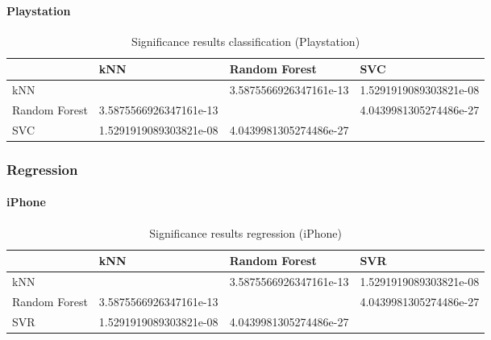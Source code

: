 \paragraph{Playstation}
\begin{table}[h]
	\begin{center}
	\begin{tabular}{| p{3.25cm} || p{3.25cm} | p{3.25cm} | p{3.25cm} |}
		\hline
		& kNN & Random Forest & SVC \\
		\hline \hline
		kNN & & 3.5875566926347161e-13 & 1.5291919089303821e-08 \\
		\hline
		Random Forest & 3.5875566926347161e-13 & & 4.0439981305274486e-27 \\
		\hline
		SVC & 1.5291919089303821e-08 & 4.0439981305274486e-27 & \\
		\hline
	\end{tabular}
	\end{center}
	\caption{Significance results classification (Playstation)}
	\label{tab_commission}
\end{table}
\subsubsection{Regression}
\paragraph{iPhone}
\begin{table}[h]
	\begin{center}
	\begin{tabular}{| p{3.25cm} || p{3.25cm} | p{3.25cm} | p{3.25cm} |}
		\hline
		& kNN & Random Forest & SVR \\
		\hline \hline
		kNN & & 3.5875566926347161e-13 & 1.5291919089303821e-08 \\
		\hline
		Random Forest & 3.5875566926347161e-13 & & 4.0439981305274486e-27 \\
		\hline
		SVR & 1.5291919089303821e-08 & 4.0439981305274486e-27 & \\
		\hline
	\end{tabular}
	\end{center}
	\caption{Significance results regression (iPhone)}
	\label{tab_commission}
\end{table}
